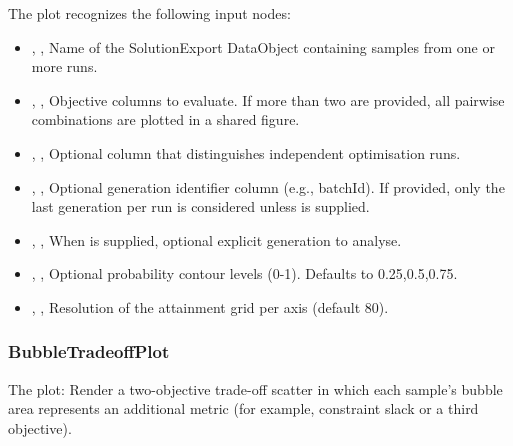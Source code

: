 The  plot recognizes the following input nodes:
\begin{itemize}
  \item {}, , Name of the SolutionExport DataObject containing samples from one or more runs.
  \item {}, , Objective columns to evaluate. If more than two are provided, all pairwise combinations are plotted in a shared figure.
  \item {}, , Optional column that distinguishes independent optimisation runs.
  \item {}, , Optional generation identifier column (e.g., batchId). If provided, only the last generation per run is considered unless  is supplied.
  \item {}, , When  is supplied, optional explicit generation to analyse.
  \item {}, , Optional probability contour levels (0-1). Defaults to 0.25,0.5,0.75.
  \item {}, , Resolution of the attainment grid per axis (default 80).
\end{itemize}

\subsubsection{BubbleTradeoffPlot}
The   plot: Render a two-objective trade-off scatter in which each sample's bubble area represents an additional metric (for example, constraint slack or a third objective).

